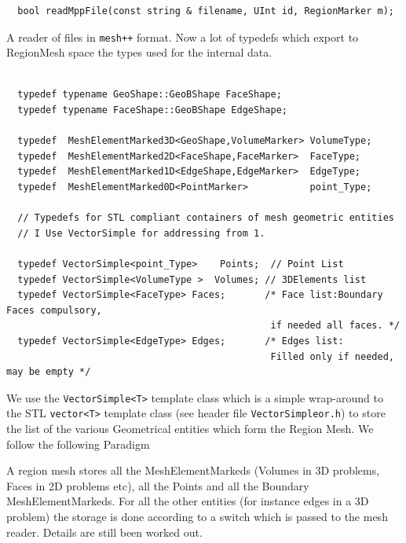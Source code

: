 \begin{verbatim}
  bool readMppFile(const string & filename, UInt id, RegionMarker m);
\end{verbatim}
A reader of files in \texttt{mesh++} format.  Now a lot of typedefs
which export to RegionMesh space the types used for the internal data.
\begin{verbatim}

  typedef typename GeoShape::GeoBShape FaceShape;
  typedef typename FaceShape::GeoBShape EdgeShape;
  
  typedef  MeshElementMarked3D<GeoShape,VolumeMarker> VolumeType;
  typedef  MeshElementMarked2D<FaceShape,FaceMarker>  FaceType;
  typedef  MeshElementMarked1D<EdgeShape,EdgeMarker>  EdgeType;
  typedef  MeshElementMarked0D<PointMarker>           point_Type; 

  // Typedefs for STL compliant containers of mesh geometric entities
  // I Use VectorSimple for addressing from 1.

  typedef VectorSimple<point_Type>    Points;  // Point List
  typedef VectorSimple<VolumeType >  Volumes; // 3DElements list
  typedef VectorSimple<FaceType> Faces;       /* Face list:Boundary Faces compulsory,
                                               if needed all faces. */
  typedef VectorSimple<EdgeType> Edges;       /* Edges list:
                                               Filled only if needed, may be empty */
\end{verbatim}  
We use the \texttt{VectorSimple<T>} template class which is a simple
wrap-around to the STL \texttt{vector<T>} template class (see header file
\texttt{VectorSimpleor.h}) to store the list of the various 
Geometrical entities which form the Region Mesh. We follow the following Paradigm
\begin{description}
\item A region mesh stores all the MeshElementMarkeds (Volumes in 3D
  problems, Faces in 2D problems etc), all the Points and all the
  Boundary MeshElementMarkeds. For all the other entities (for instance edges
  in a 3D problem) the storage is done according to a switch which is
  passed to the mesh reader.  Details are still been worked out.
\end{description}

